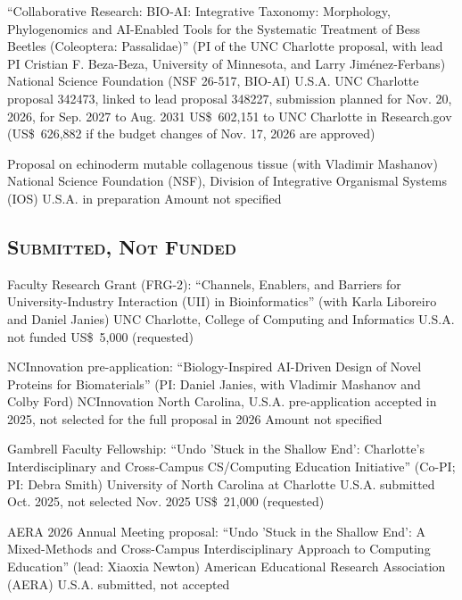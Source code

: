 \documentclass[11pt, letterpaper, sans]{moderncv}
\begin{document}
    {``Collaborative Research: BIO-AI: Integrative Taxonomy: Morphology, Phylogenomics and AI-Enabled Tools for the Systematic Treatment of Bess Beetles (Coleoptera: Passalidae)'' (PI of the UNC Charlotte proposal, with lead PI Cristian F. Beza-Beza, University of Minnesota, and Larry Jiménez-Ferbans)}
    {National Science Foundation (NSF 26-517, BIO-AI)}
    {U.S.A.}
    {UNC Charlotte proposal 342473, linked to lead proposal 348227, submission planned for Nov. 20, 2026, for Sep. 2027 to Aug. 2031}
    {US\$~602,151 to UNC Charlotte in Research.gov (US\$~626,882 if the budget changes of Nov. 17, 2026 are approved)}{}

    {Proposal on echinoderm mutable collagenous tissue (with Vladimir Mashanov)}
    {National Science Foundation (NSF), Division of Integrative Organismal Systems (IOS)}
    {U.S.A.}
    {in preparation}
    {Amount not specified}{}

\vspace{.5em}
	\subsection{\textsc{Submitted, Not Funded}}
\vspace{.5em}

    {Faculty Research Grant (FRG-2): ``Channels, Enablers, and Barriers for University-Industry Interaction (UII) in Bioinformatics'' (with Karla Liboreiro and Daniel Janies)}
    {UNC Charlotte, College of Computing and Informatics}
    {U.S.A.}
    {not funded}
    {US\$~5,000 (requested)}{}

    {NCInnovation pre-application: ``Biology-Inspired AI-Driven Design of Novel Proteins for Biomaterials'' (PI: Daniel Janies, with Vladimir Mashanov and Colby Ford)}
    {NCInnovation}
    {North Carolina, U.S.A.}
    {pre-application accepted in 2025, not selected for the full proposal in 2026}
    {Amount not specified}{}

    {Gambrell Faculty Fellowship: ``Undo 'Stuck in the Shallow End': Charlotte's Interdisciplinary and Cross-Campus CS/Computing Education Initiative'' (Co-PI; PI: Debra Smith)}
    {University of North Carolina at Charlotte}
    {U.S.A.}
    {submitted Oct. 2025, not selected Nov. 2025}
    {US\$~21,000 (requested)}{}

    {AERA 2026 Annual Meeting proposal: ``Undo 'Stuck in the Shallow End': A Mixed-Methods and Cross-Campus Interdisciplinary Approach to Computing Education'' (lead: Xiaoxia Newton)}
    {American Educational Research Association (AERA)}
    {U.S.A.}
    {submitted, not accepted}
    {}{}
\end{document}
